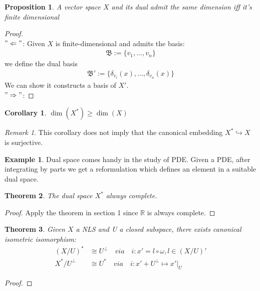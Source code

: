 \documentclass[a4paper,11pt,fleqn]{book}
\newtheorem{theorem}{Theorem}[section]
\newtheorem{corollary}{Corollary}[theorem]
\newtheorem{proposition}[theorem]{Proposition}
\theoremstyle{definition}
\newtheorem*{example}{Example}
\theoremstyle{remark}
\newtheorem*{remark}{Remark}
\begin{document}
\begin{proposition}
	A vector space $X$ and its dual admit the same dimension iff it's finite dimensional
\end{proposition}
\begin{proof}
	\quad\\
	$"\Leftarrow"$: Given $X$ is finite-dimensional and admits the basis:
	\begin{align*}
		\mathfrak{B}:= \{v_1, \dots, v_n\}
	\end{align*}
	we define the dual basis
	\begin{align*}
		\mathfrak{B}':= \{\delta_{v_i}(x), \dots, \delta_{v_n}(x)\}
	\end{align*}
	We can show it constructs a basis of $X'$.\\
	$"\Rightarrow"$: 
\end{proof}
\begin{corollary}
	$\dim(X^*) \geq \dim(X)$
\end{corollary}
\begin{remark}
This corollary does not imply that the canonical embedding $X^* \hookrightarrow X$ is surjective. 	
\end{remark}


\begin{example}
	Dual space comes handy in the study of PDE. Given a PDE, after integrating by parts we get a reformulation which defines an element in a suitable dual space.
\end{example}

\begin{theorem}
	The dual space $X^*$ always complete.
\end{theorem}
\begin{proof}
	Apply the theorem in section 1 since $\mathbb{R}$ is always complete.
\end{proof}

\begin{theorem}
	Given $X$ a NLS and U a closed subspace, there exists canonical isometric isomorphism:
	\begin{align*}
		(X\slash U)^* &\cong U^\perp \quad via \quad i: x' = l \circ \omega, l \in (X\slash U)'  \\
		 X^* \slash U^\perp &\cong U^* \quad via \quad i: x' + U^\perp \mapsto x'|_U 
	\end{align*}
\end{theorem}
\begin{proof}
\end{proof}
\end{document}
